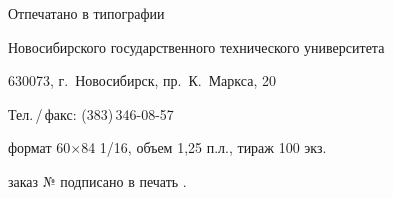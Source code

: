 
\newpage
\thispagestyle{empty}

\vspace*{0pt plus1fill}

\begin{center}
    Отпечатано в типографии \par
    Новосибирского государственного технического университета \par\smallskip
    
    630073, г.~Новосибирск, пр.~К.~Маркса, 20 \par
    Тел.\,/\,факс: (383)\,346-08-57 \par\smallskip
    
    формат 60$\times$84 1/16, объем 1,25 п.л., тираж 100 экз. \par
	заказ №  подписано в печать .
\end{center}